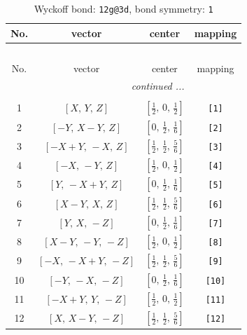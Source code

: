 \documentclass[fleqn,8pt]{jsarticle}
\begin{document}
\begin{longtable}{cccc}
\caption{Wyckoff bond: {\tt 12g@3d}, bond symmetry: {\tt 1}}
 \\
 \hline \hline
No. & vector & center & mapping \\ \hline \endfirsthead

\multicolumn{3}{l}{\tablename\ \thetable{}} \\
 \hline \hline
No. & vector & center & mapping \\ \hline \endhead

 \hline \hline
\multicolumn{3}{r}{\footnotesize\it continued ...} \\ \endfoot

 \hline \hline
\multicolumn{3}{r}{} \\ \endlastfoot

1 & $\left[ X,\, Y,\, Z \right]$ & $\left[ \frac{1}{2},\, 0,\, \frac{1}{2} \right]$ & {\tt [1]} \\ \hline
2 & $\left[ - Y,\, X - Y,\, Z \right]$ & $\left[ 0,\, \frac{1}{2},\, \frac{1}{6} \right]$ & {\tt [2]} \\ \hline
3 & $\left[ - X + Y,\, - X,\, Z \right]$ & $\left[ \frac{1}{2},\, \frac{1}{2},\, \frac{5}{6} \right]$ & {\tt [3]} \\ \hline
4 & $\left[ - X,\, - Y,\, Z \right]$ & $\left[ \frac{1}{2},\, 0,\, \frac{1}{2} \right]$ & {\tt [4]} \\ \hline
5 & $\left[ Y,\, - X + Y,\, Z \right]$ & $\left[ 0,\, \frac{1}{2},\, \frac{1}{6} \right]$ & {\tt [5]} \\ \hline
6 & $\left[ X - Y,\, X,\, Z \right]$ & $\left[ \frac{1}{2},\, \frac{1}{2},\, \frac{5}{6} \right]$ & {\tt [6]} \\ \hline
7 & $\left[ Y,\, X,\, - Z \right]$ & $\left[ 0,\, \frac{1}{2},\, \frac{1}{6} \right]$ & {\tt [7]} \\ \hline
8 & $\left[ X - Y,\, - Y,\, - Z \right]$ & $\left[ \frac{1}{2},\, 0,\, \frac{1}{2} \right]$ & {\tt [8]} \\ \hline
9 & $\left[ - X,\, - X + Y,\, - Z \right]$ & $\left[ \frac{1}{2},\, \frac{1}{2},\, \frac{5}{6} \right]$ & {\tt [9]} \\ \hline
10 & $\left[ - Y,\, - X,\, - Z \right]$ & $\left[ 0,\, \frac{1}{2},\, \frac{1}{6} \right]$ & {\tt [10]} \\ \hline
11 & $\left[ - X + Y,\, Y,\, - Z \right]$ & $\left[ \frac{1}{2},\, 0,\, \frac{1}{2} \right]$ & {\tt [11]} \\ \hline
12 & $\left[ X,\, X - Y,\, - Z \right]$ & $\left[ \frac{1}{2},\, \frac{1}{2},\, \frac{5}{6} \right]$ & {\tt [12]} \\
\end{longtable}
\end{document}
